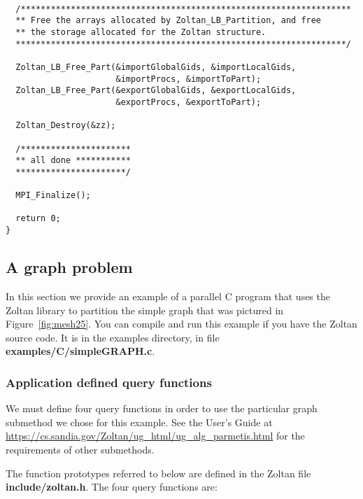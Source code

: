 \clearpage
\begin{flushleft}
\begin{verbatim}

  /******************************************************************
  ** Free the arrays allocated by Zoltan_LB_Partition, and free
  ** the storage allocated for the Zoltan structure.
  ******************************************************************/

  Zoltan_LB_Free_Part(&importGlobalGids, &importLocalGids, 
                      &importProcs, &importToPart);
  Zoltan_LB_Free_Part(&exportGlobalGids, &exportLocalGids, 
                      &exportProcs, &exportToPart);

  Zoltan_Destroy(&zz);

  /**********************
  ** all done ***********
  **********************/

  MPI_Finalize();

  return 0;
}

\end{verbatim}
\end{flushleft}

\clearpage
\subsection{A graph problem}

In this section we provide an example of a parallel C program
that uses the Zoltan library to partition the simple graph that
was pictured in Figure~\ref{fig:mesh25}.  You can compile
and run this example if you have the Zoltan source code.  It is
in the examples directory, in file \textbf{examples/C/simpleGRAPH.c}.

\subsubsection{Application defined query functions}

We must define four query functions in order to use the
particular graph submethod we chose for this example.  See the
User's Guide at
\url{https://cs.sandia.gov/Zoltan/ug_html/ug_alg_parmetis.html} for
the requirements of other submethods.

The function prototypes referred to below
are defined in the Zoltan file \textbf{include/zoltan.h}.
The four query functions are:

